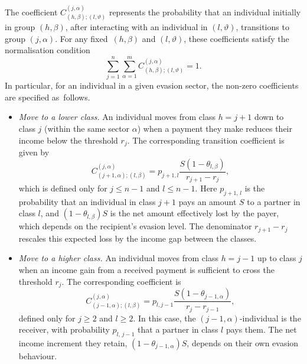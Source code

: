 \documentclass[11pt]{article}
\theoremstyle{plain}
\theoremstyle{definition}
\newcommand{\1}{\mathbf{1}}
\begin{document}
The coefficient $C^{(j,\alpha)}_{(h,\beta);(l,\vartheta)}$ represents the probability that an individual initially in group $(h,\beta)$, after interacting with an individual in $(l,\vartheta)$, transitions to group $(j,\alpha)$. For any fixed~$(h,\beta)$ and $(l,\vartheta)$, these coefficients satisfy the normalisation condition
\begin{equation*}
    \sum_{j=1}^{n}\sum_{\alpha=1}^{m} C^{(j,\alpha)}_{(h,\beta);(l,\vartheta)} =1.
\end{equation*}
In particular, for an individual in a given evasion sector, the non-zero coefficients are specified as~follows.
\begin{itemize}
\item[\emph{i}.] \textit{Move to a lower class.}
An individual moves from class $h = j+1$ down to class $j$ (within the same sector $\alpha$) when a payment they make reduces their income below the threshold $r_j$. The corresponding transition coefficient is given by
\begin{equation*}
C^{(j,\alpha)}_{(j+1,\alpha);(l,\beta)}
= p_{j+1,l}\frac{S(1-\theta_{l,\beta})}{r_{j+1}-r_j},
\end{equation*}
which is defined only for $j \leq n-1$ and $l \leq n-1$. Here $p_{j+1,\,l}$ is the probability that an individual in class $j+1$ pays an amount $S$ to a partner in class $l$, and $(1-\theta_{l,\beta})S$ is the net amount effectively lost by the payer, which depends on the recipient's evasion level. The denominator $r_{j+1}-r_j$ rescales this expected loss by the income gap between the classes.

\item[\emph{ii}.] \textit{Move to a higher class.}
An individual moves from class $h = j-1$ up to class $j$ when an income gain from a received payment is sufficient to cross the threshold $r_j$. The corresponding coefficient is
\begin{equation*}
C^{(j,\alpha)}_{(j-1,\alpha);(l,\beta)}
= p_{l,j-1}\frac{S(1-\theta_{j-1,\alpha})}{r_j-r_{j-1}},
\end{equation*}
defined only for $j \geq 2$ and $l \geq 2$. In this case, the $(j-1,\alpha)$-individual is the receiver, with probability $p_{l,\,j-1}$ that a partner in class $l$ pays them. The net income increment they retain, $(1-\theta_{j-1,\alpha})S$, depends on their own evasion behaviour.


\end{itemize}
\end{document}

